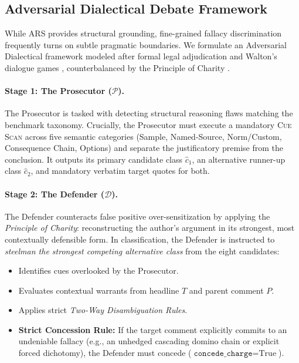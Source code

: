 \documentclass[11pt]{article}
\begin{document}
\subsection{Adversarial Dialectical Debate Framework}
While ARS provides structural grounding, fine-grained fallacy discrimination frequently turns on subtle pragmatic boundaries. We formulate an Adversarial Dialectical framework modeled after formal legal adjudication and Walton's dialogue games \cite{walton1998}, counterbalanced by the Principle of Charity \cite{quine1960,davidson1973}.

\paragraph{Stage 1: The Prosecutor ($\mathcal{P}$).}
The Prosecutor is tasked with detecting structural reasoning flaws matching the benchmark taxonomy. Crucially, the Prosecutor must execute a mandatory \textsc{Cue Scan} across five semantic categories (Sample, Named-Source, Norm/Custom, Consequence Chain, Options) and separate the justificatory premise from the conclusion. It outputs its primary candidate class $\hat{c}_1$, an alternative runner-up class $\hat{c}_2$, and mandatory verbatim target quotes for both.

\paragraph{Stage 2: The Defender ($\mathcal{D}$).}
The Defender counteracts false positive over-sensitization by applying the \textit{Principle of Charity}: reconstructing the author's argument in its strongest, most contextually defensible form. In classification, the Defender is instructed to \textit{steelman the strongest competing alternative class} from the eight candidates:
\begin{itemize}[leftmargin=*,itemsep=1pt,topsep=2pt]
    \item Identifies cues overlooked by the Prosecutor.
    \item Evaluates contextual warrants from headline $T$ and parent comment $P$.
    \item Applies strict \textit{Two-Way Disambiguation Rules}.
    \item \textbf{Strict Concession Rule:} If the target comment explicitly commits to an undeniable fallacy (e.g., an unhedged cascading domino chain or explicit forced dichotomy), the Defender must concede ($\texttt{concede\_charge} = \text{True}$).
\end{itemize}
\end{document}
